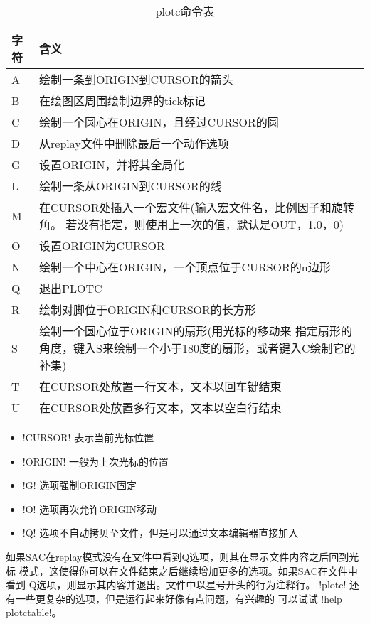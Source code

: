 \begin{table}[!ht]
\centering
\ttfamily
\small
\caption{plotc命令表}
\begin{tabular}{p{1cm}p{10cm}}
	\toprule
	字符	& 	含义	\\
	\midrule
	A		&	绘制一条到ORIGIN到CURSOR的箭头	\\
	B		&	在绘图区周围绘制边界的tick标记  \\
	C		&	绘制一个圆心在ORIGIN，且经过CURSOR的圆	\\
	D		&	从replay文件中删除最后一个动作选项	\\
	G		&	设置ORIGIN，并将其全局化	\\
	L		& 	绘制一条从ORIGIN到CURSOR的线	\\
	M		&	在CURSOR处插入一个宏文件(输入宏文件名，比例因子和旋转角。
                若没有指定，则使用上一次的值，默认是OUT，1.0，0)\\
	O		&	设置ORIGIN为CURSOR		\\
	N		&	绘制一个中心在ORIGIN，一个顶点位于CURSOR的n边形 \\
	Q		&	退出PLOTC	\\
	R		&	绘制对脚位于ORIGIN和CURSOR的长方形	\\
	S		&	绘制一个圆心位于ORIGIN的扇形(用光标的移动来
                指定扇形的角度，键入S来绘制一个小于180度的扇形，或者键入C绘制它的补集)\\
	T		&	在CURSOR处放置一行文本，文本以回车键结束	\\
	U		&	在CURSOR处放置多行文本，文本以空白行结束	\\
	\bottomrule
\end{tabular}
\end{table}
\begin{itemize}
\item !CURSOR! 表示当前光标位置
\item !ORIGIN! 一般为上次光标的位置
\item !G! 选项强制ORIGIN固定
\item !O! 选项再次允许ORIGIN移动
\item !Q! 选项不自动拷贝至文件，但是可以通过文本编辑器直接加入
\end{itemize}
如果SAC在replay模式没有在文件中看到Q选项，则其在显示文件内容之后回到光标
模式，这使得你可以在文件结束之后继续增加更多的选项。如果SAC在文件中看到
Q选项，则显示其内容并退出。文件中以星号开头的行为注释行。
!plotc! 还有一些更复杂的选项，但是运行起来好像有点问题，有兴趣的
可以试试 !help plotctable!。
